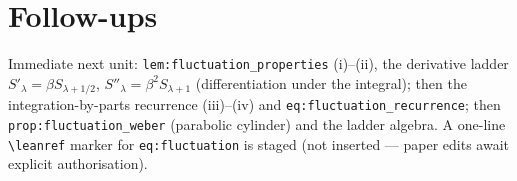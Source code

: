 \documentclass[11pt]{article}
\begin{document}
\section{Follow-ups}
Immediate next unit: \texttt{lem:fluctuation\_properties} (i)--(ii), the derivative ladder
$S'_\lambda=\beta S_{\lambda+1/2}$, $S''_\lambda=\beta^2 S_{\lambda+1}$ (differentiation under the
integral); then the integration-by-parts recurrence (iii)--(iv) and \texttt{eq:fluctuation\_recurrence};
then \texttt{prop:fluctuation\_weber} (parabolic cylinder) and the ladder algebra. A one-line
\texttt{\textbackslash leanref} marker for \texttt{eq:fluctuation} is staged (not inserted --- paper
edits await explicit authorisation).
\end{document}
